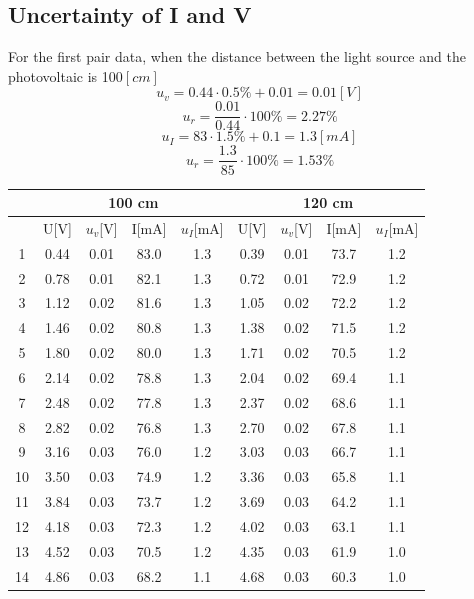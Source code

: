 \documentclass[12pt]{article}
\begin{document}
\subsection{Uncertainty of I and V}
For the first pair data, when the distance between the light source and the photovoltaic is 100$[cm]$
$$u_v=0.44\cdot0.5\%+0.01=0.01[V]$$
$$u_r=\frac{0.01}{0.44}\cdot100\%=2.27\%$$
$$u_I=83\cdot1.5\%+0.1=1.3[mA]$$
$$u_r=\frac{1.3}{85}\cdot100\%=1.53\%$$
\begin{table}[H]
\centering
\begin{tabular}{|c|c|c|c|c|c|c|c|c|}
\hline
   & \multicolumn{4}{c|}{100 cm} & \multicolumn{4}{c|}{120 cm} \\ \hline
   & U[V] &$u_v$[V] & I[mA]&$u_I$[mA]  & U[V]&$u_v$[V] & I[mA]&$u_I$[mA] \\ \hline
1  & 0.44  &0.01      & 83.0&1.3         & 0.39&0.01        & 73.7 &1.2        \\ \hline
2  & 0.78  &0.01      & 82.1&1.3         & 0.72&0.01        & 72.9 &1.2        \\ \hline
3  & 1.12  &0.02      & 81.6&1.3         & 1.05&0.02        & 72.2 &1.2        \\ \hline
4  & 1.46  &0.02      & 80.8&1.3         & 1.38&0.02        & 71.5 &1.2        \\ \hline
5  & 1.80  &0.02      & 80.0&1.3         & 1.71&0.02       & 70.5  &1.2       \\ \hline
6  & 2.14  &0.02      & 78.8&1.3         & 2.04&0.02       & 69.4  &1.1       \\ \hline
7  & 2.48  &0.02      & 77.8&1.3         & 2.37&0.02        & 68.6 &1.1        \\ \hline
8  & 2.82  &0.02      & 76.8&1.3         & 2.70&0.02        & 67.8 &1.1        \\ \hline
9  & 3.16  &0.03      & 76.0&1.2         & 3.03&0.03        & 66.7 &1.1       \\ \hline
10 & 3.50  &0.03      & 74.9&1.2         & 3.36&0.03        & 65.8 &1.1        \\ \hline
11 & 3.84  &0.03      & 73.7&1.2         & 3.69&0.03        & 64.2 &1.1        \\ \hline
12 & 4.18  &0.03      & 72.3&1.2         & 4.02&0.03        & 63.1 &1.1        \\ \hline
13 & 4.52  &0.03      & 70.5&1.2         & 4.35&0.03        & 61.9 &1.0        \\ \hline
14 & 4.86  &0.03      & 68.2&1.1         & 4.68&0.03        & 60.3 &1.0        \\ \hline

\end{tabular}
\end{table}
\end{document}
